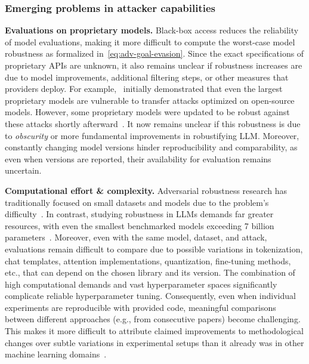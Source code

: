 \vspace{-5pt}
\subsubsection{Emerging problems in attacker capabilities}
\textbf{Evaluations on proprietary models.} Black-box access reduces the reliability of model evaluations, making it more difficult to compute the worst-case model robustness as formalized in~\autoref{eq:adv-goal-evasion}. Since the exact specifications of proprietary APIs are unknown, it also remains unclear if robustness increases are due to model improvements, additional filtering steps, or other measures that providers deploy. For example,~\citet{zou2023universal} initially demonstrated that even the largest proprietary models are vulnerable to transfer attacks optimized on open-source models. However, some proprietary models were updated to be robust against these attacks shortly afterward~\cite{hurst2024gpt}. It now remains unclear if this robustness is due to \textit{obscurity} or more fundamental improvements in robustifying LLM. 
%
Moreover, constantly changing model versions hinder reproducibility and comparability, as even when versions are reported, their availability for evaluation remains uncertain.

\textbf{Computational effort \& complexity.} Adversarial robustness research has traditionally focused on small datasets and models due to the problem's difficulty~\cite{bartoldson2024adversarial}. In contrast, studying robustness in LLMs demands far greater resources, with even the smallest benchmarked models exceeding 7 billion parameters~\cite{xhonneux2024efficient, casper2024defending}. Moreover, even with the same model, dataset, and attack, evaluations remain difficult to compare due to possible variations in tokenization, chat templates, attention implementations, quantization, fine-tuning methods, etc., that can depend on the chosen library and its version. The combination of high computational demands and vast hyperparameter spaces significantly complicate reliable hyperparameter tuning. Consequently, even when individual experiments are reproducible with provided code, meaningful comparisons between different approaches (e.g., from consecutive papers) become challenging. This makes it more difficult to attribute claimed improvements to methodological changes over subtle variations in experimental setups than it already was in other machine learning domains~\cite{musgrave2020metric, qi2024evaluating}.

